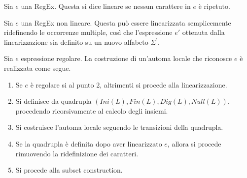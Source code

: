 \documentclass{subfiles}
\begin{document}
\begin{Definition*}
    Sia \(e\) una RegEx. Questa si dice lineare se nessun carattere in \(e\) è ripetuto.
\end{Definition*}

\noindent Sia \(e\) una RegEx non lineare. Questa può essere linearizzata semplicemente ridefinendo le occorrenze multiple,
così che l'espressione \(e'\) ottenuta dalla linearizzazione sia definito su un nuovo alfabeto \(\Sigma^{'}\).

\begin{Algorithm*}
    Sia \(e\) espressione regolare. La costruzione di un'automa locale che riconosce \(e\) è realizzata come segue.
    \begin{enumerate}
        \item Se \(e\) è regolare si al punto 2, altrimenti si procede alla linearizzazione.
        \item Si definisce da quadrupla \((Ini(L), Fin(L), Dig(L), Null(L))\), procedendo ricorsivamente al calcolo degli insiemi.
        \item Si costruisce l'automa locale seguendo le transizioni della quadrupla.
        \item Se la quadrupla è definita dopo aver linearizzato \(e\), allora si procede rimuovendo la ridefinizione dei caratteri.
        \item Si procede alla subset construction.
    \end{enumerate}
\end{Algorithm*}
\end{document}
